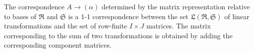 The correspondence $A \to (\alpha)$ determined by the matrix representation relative to bases of $\mathfrak{R}$ and $\mathfrak{S}$ is a 1-1 correspondence between the set $\mathfrak{L}(\mathfrak{R}, \mathfrak{S})$ of linear transformations and the set of row-finite $I \times J$ matrices. The matrix corresponding to the sum of two transformations is obtained by adding the corresponding component matrices.
